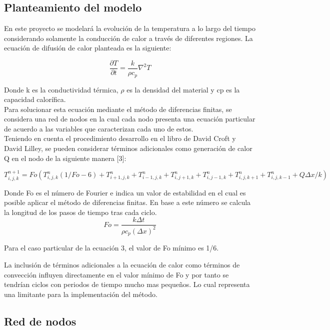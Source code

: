 \documentclass{article}
\begin{document}
	\subsection{Planteamiento del modelo}
	En este proyecto se modelará la evolución de la temperatura a lo largo del tiempo considerando solamente la conducción de calor a través de diferentes regiones. La ecuación de difusión de calor planteada es la siguiente:
	
	\begin{equation}
		\frac{\partial T}{\partial t} = \frac{k}{\rho c_p} \nabla^2 T
	\end{equation}
	
	Donde k es la conductividad térmica, \(\rho\) es la densidad del material y cp es la capacidad calorífica.\\
	
	Para solucionar esta ecuación mediante el método de diferencias finitas, se considera una red de nodos en la cual cada nodo presenta una ecuación particular de acuerdo a las variables que caracterizan cada uno de estos.\\
	
	Teniendo en cuenta el procedimiento desarrollo en el libro de David Croft y David Lilley, se pueden considerar términos adicionales como generación de calor Q en el nodo de la siguiente manera [3]: 
	
	\begin{equation}
		T^{n+1}_{i,j,k} = Fo(T^{n}_{i,j,k}(1/Fo -6)+T^{n}_{i+1,j,k}+T^{n}_{i-1,j,k}+T^{n}_{i,j+1,k}+T^{n}_{i,j-1,k}+T^{n}_{i,j,k+1}+T^{n}_{i,j,k-1} + Q\Delta x/k) 
	\end{equation}
	
	Donde Fo es el número de Fourier e indica un valor de estabilidad en el cual es posible aplicar el método de diferencias finitas. En base a este número se calcula la longitud de los pasos de tiempo tras cada ciclo.
	\begin{equation}
		Fo = \frac{k\Delta t}{\rho c_p (\Delta x)^2}
	\end{equation}
	
	Para el caso particular de la ecuación 3, el valor de Fo mínimo es 1/6.
	
	La inclusión de términos adicionales a la ecuación de calor como términos de convección influyen directamente en el valor mínimo de Fo y por tanto se tendrían ciclos con periodos de tiempo mucho mas pequeños. Lo cual representa una limitante para la implementación del método.
	
	\subsection{Red de nodos}
	
\end{document}

